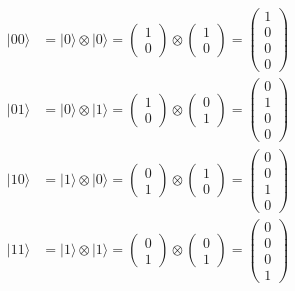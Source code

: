 \documentclass[11pt]{article}
\begin{document}
\begin{align}
|00 \rangle &= |0\rangle \otimes |0\rangle = \begin{pmatrix} 1\\0 \end{pmatrix} \otimes \begin{pmatrix} 1\\0 \end{pmatrix} = \begin{pmatrix} 1\\0\\0\\0 \end{pmatrix} \\
|01 \rangle &= |0\rangle \otimes |1\rangle = \begin{pmatrix} 1\\0 \end{pmatrix} \otimes \begin{pmatrix} 0\\1 \end{pmatrix} = \begin{pmatrix} 0\\1\\0\\0 \end{pmatrix} \\
|10 \rangle &= |1\rangle \otimes |0\rangle = \begin{pmatrix} 0\\1 \end{pmatrix} \otimes \begin{pmatrix} 1\\0 \end{pmatrix} = \begin{pmatrix} 0\\0\\1\\0 \end{pmatrix} \\
|11 \rangle &= |1\rangle \otimes |1\rangle = \begin{pmatrix} 0\\1 \end{pmatrix} \otimes \begin{pmatrix} 0\\1 \end{pmatrix} = \begin{pmatrix} 0\\0\\0\\1 \end{pmatrix}
\end{align}
\end{document}
